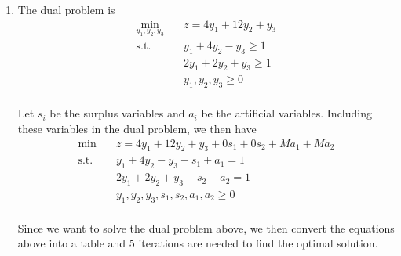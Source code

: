 \documentclass[a4paper,10pt]{article}
\begin{document}
\begin{enumerate}
\begin{enumerate}
{\begin{enumerate}
                The values of the slack variables are
                \[
                    \omega_1 = 0, \omega_2 = 0, \omega_3 = 3 
                \]
    
                The values of the decision variables are 
                \[
                    x_1 = \frac{8}{3} \\ x_2 = \frac{2}{3}
                \]

                The objective value
                \[
                    z = x_1 + x_2 = \frac{10}{3}
                \]

            \item The dual problem is
                \begin{equation}
                    \begin{aligned}
                        \min_{y_1, y_2, y_3} \quad & z = 4y_1 + 12y_2 + y_3 \\
                        \textrm{s.t.}   \quad & y_1 + 4y_2 - y_3 \geq 1 \\
                                        \quad & 2y_1 + 2y_2 + y_3 \geq 1 \\
                                        \quad & y_1, y_2, y_3 \geq 0 \\
                    \end{aligned}
                \end{equation}

                Let $s_i$ be the surplus variables and $a_i$ be the artificial variables. Including these variables in the dual problem, we then have
                \begin{equation}
                    \begin{aligned}
                        \min \quad & z = 4y_1 + 12y_2 + y_3 + 0s_1 + 0s_2 + Ma_1 + Ma_2 \\
                        \textrm{s.t.}   \quad & y_1 + 4y_2 - y_3 - s_1 + a_1 =  1 \\
                                        \quad & 2y_1 + 2y_2 + y_3 - s_2 + a_2 = 1 \\
                                        \quad & y_1, y_2, y_3, s_1, s_2, a_1, a_2 \geq 0 \\
                    \end{aligned}
                \end{equation}

                Since we want to solve the dual problem above, we then convert the equations above into a table and 5 iterations are needed to find the optimal solution.


\end{enumerate}}
\end{enumerate}
\end{enumerate}
\end{document}
